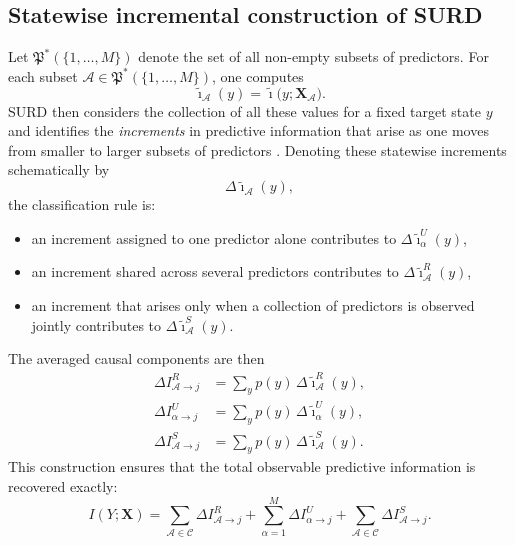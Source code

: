 \documentclass[12pt, a4paper]{article}
\begin{document}
\subsection{Statewise incremental construction of SURD}

Let \(\mathfrak{P}^\ast(\{1,\dots,M\})\) denote the set of all non-empty subsets of predictors. For each subset \(\mathcal{A}\in \mathfrak{P}^\ast(\{1,\dots,M\})\), one computes
\begin{equation}
\tilde{\imath}_{\mathcal{A}}(y)
=
\tilde{\imath}\bigl(y;\mathbf{X}_{\mathcal{A}}\bigr).
\end{equation}
SURD then considers the collection of all these values for a fixed target state \(y\) and identifies the \emph{increments} in predictive information that arise as one moves from smaller to larger subsets of predictors \cite{MartinezSanchez2024SURD}. Denoting these statewise increments schematically by
\begin{equation}
\Delta \tilde{\imath}_{\mathcal{A}}(y),
\end{equation}
the classification rule is:
\begin{itemize}
    \item an increment assigned to one predictor alone contributes to \(\Delta \tilde{\imath}_{\alpha}^{U}(y)\),
    \item an increment shared across several predictors contributes to \(\Delta \tilde{\imath}_{\mathcal{A}}^{R}(y)\),
    \item an increment that arises only when a collection of predictors is observed jointly contributes to \(\Delta \tilde{\imath}_{\mathcal{A}}^{S}(y)\).
\end{itemize}

The averaged causal components are then
\begin{align}
\Delta I_{\mathcal{A}\to j}^{R}
&=
\sum_{y} p(y)\,\Delta \tilde{\imath}_{\mathcal{A}}^{R}(y),\\
\Delta I_{\alpha\to j}^{U}
&=
\sum_{y} p(y)\,\Delta \tilde{\imath}_{\alpha}^{U}(y),\\
\Delta I_{\mathcal{A}\to j}^{S}
&=
\sum_{y} p(y)\,\Delta \tilde{\imath}_{\mathcal{A}}^{S}(y).
\end{align}
This construction ensures that the total observable predictive information is recovered exactly:
\begin{equation}
I(Y;\mathbf{X})
=
\sum_{\mathcal{A}\in\mathcal{C}} \Delta I_{\mathcal{A}\to j}^{R}
+
\sum_{\alpha=1}^{M} \Delta I_{\alpha\to j}^{U}
+
\sum_{\mathcal{A}\in\mathcal{C}} \Delta I_{\mathcal{A}\to j}^{S}.
\label{eq:observable_recovery}
\end{equation}
\end{document}
